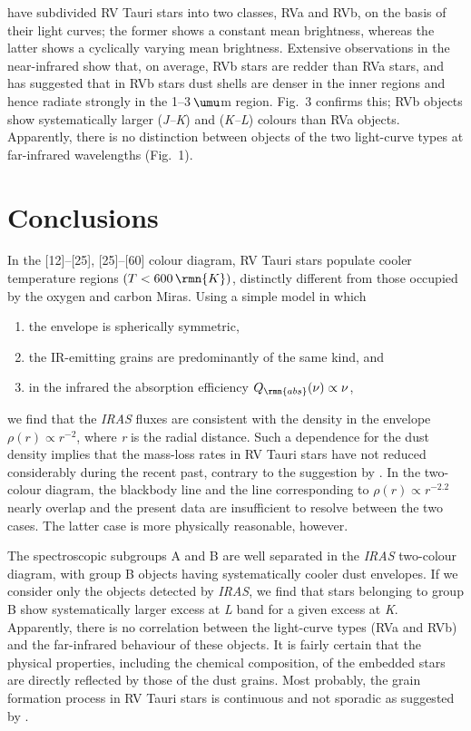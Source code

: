 \documentclass[useAMS,usedcolumn,usegraphicx,usenatbib]{mn2e}
\begin{document}
\citet{b13} have subdivided RV Tauri stars into two classes, RVa
and RVb, on the basis of their light curves; the former shows a
constant mean  brightness, whereas the latter shows a cyclically
varying  mean brightness. Extensive observations in the
near-infrared show that, on average, RVb stars are redder than RVa
stars, and \citet{b15} has suggested that in RVb stars dust shells
are denser in the inner regions and hence radiate strongly in the
1--3$\,\umu$m region. Fig.~3 confirms this; RVb objects show
systematically larger ({\it J--K\/}) and ({\it K--L\/}) colours
than RVa objects. Apparently, there is no distinction between
objects of the two light-curve types at far-infrared wavelengths
(Fig.~1).

\section{Conclusions}

In the [12]--[25], [25]--[60] colour diagram, RV Tauri stars populate
cooler temperature regions $(T<600 \,\rmn{K})$, distinctly different from
those occupied by the oxygen and carbon Miras. Using a simple model
in which
\begin{enumerate}
  \item the envelope is spherically symmetric,
  \item the IR-emitting grains are predominantly of the same kind, and
  \item in the infrared the absorption efficiency $Q_{\rmn{abs}}
        (\nu)\propto\nu$,
\end{enumerate}
we find that the {\it IRAS\/} fluxes are consistent with the
density in the envelope $\rho(r)\propto r^{-2}$, where {\it r\/}
is the radial distance. Such a dependence for the dust density
implies that the mass-loss rates in RV Tauri stars have not
reduced considerably during the recent past, contrary to the
suggestion by \citet{b12}. In the two-colour diagram, the
blackbody line and the line corresponding to $\rho(r)\propto
r^{-2.2}$ nearly overlap and the present data are insufficient to
resolve between the two cases. The latter case is more physically
reasonable, however.

The spectroscopic subgroups A and B are well separated in  the
{\it IRAS\/} two-colour diagram, with group B objects  having
systematically cooler dust envelopes. If we consider only the
objects detected by {\it IRAS}, we find that stars belonging to
group B show systematically larger excess at {\it L\/} band for a
given excess at {\it K}. Apparently, there is no correlation
between the light-curve types (RVa and RVb) and the far-infrared
behaviour of these objects. It is fairly certain that the physical
properties, including the chemical composition, of the embedded
stars are directly reflected by those of the dust grains. Most
probably, the grain formation process in RV Tauri stars is
continuous and not sporadic as suggested by \citet{b9}.
\end{document}
